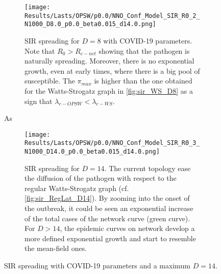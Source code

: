 \documentclass[a4paper,10pt,twoside]{book} %
\theoremstyle{definition}
\begin{document}
\begin{figure}[p]
	\centering
    \begin{subfigure}[t]{\linewidth}
        \texttt{[image: Results/Lasts/OPSW/p0.0/NNO\_Conf\_Model\_SIR\_R0\_2\_N1000\_D8.0\_p0.0\_beta0.015\_d14.0.png]}
		\centering
        \caption{SIR spreading for $D = 8$ with COVID-19 parameters. Note that $R_0 > R_{c-net}$ showing that the pathogen is naturally spreading. Moreover, there is no exponential growth, even at early times, where there is a big pool of susceptible. The $\pi_{max} $ is higher than the one obtained for the Watts-Strogatz graph in \autoref{fig:sir_WS_D8} as a sign that $\lambda_{c-OPSW} < \lambda_{c-WS}$.}
        \label{fig:sir_O-PSW_D8}
    \end{subfigure}As
	\vfill
	\begin{subfigure}[b]{\linewidth}
		\centering
        \texttt{[image: Results/Lasts/OPSW/p0.0/NNO\_Conf\_Model\_SIR\_R0\_3\_N1000\_D14.0\_p0.0\_beta0.015\_d14.0.png]}
        \caption{SIR spreading for $D = 14$. The current topology ease the diffusion of the pathogen with respect to the regular Watts-Strogatz graph (cf. \autoref{fig:sir_RegLat_D14}). By zooming into the onset of the outbreak, it could be seen an exponential increase of the total cases of the network curve (green curve). For $D > 14$, the epidemic curves on network develop a more defined exponential growth and start to resemble the mean-field ones.}
        \label{fig:sir_O-PSW_D14_p0}
    \end{subfigure}
	\caption{SIR spreading with COVID-19 parameters and a maximum $D = 14$.}
	\label{fig:sir_O-PSW_COVID}
\end{figure}
\end{document}
